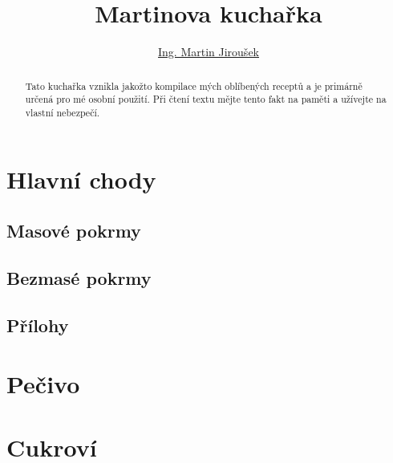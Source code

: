 \documentclass[%
a4paper,
11pt
]{article}
\begin{document}
\title{Martinova kuchařka}
\author{\href{martin.luther.jirousek@gmail.com}{Ing. Martin Jiroušek}}
\maketitle

\begin{abstract}
	Tato kuchařka vznikla jakožto kompilace mých oblíbených receptů a je primárně určená pro mé osobní použití. Při čtení textu mějte tento fakt na paměti a užívejte na vlastní nebezpečí.
\end{abstract}

\tableofcontents

\vspace{5em}


%

\section{Hlavní chody}
\subsection{Masové pokrmy}




\subsection{Bezmasé pokrmy}


\subsection{Přílohy}


\section{Pečivo}


\section{Cukroví}

\end{document}
